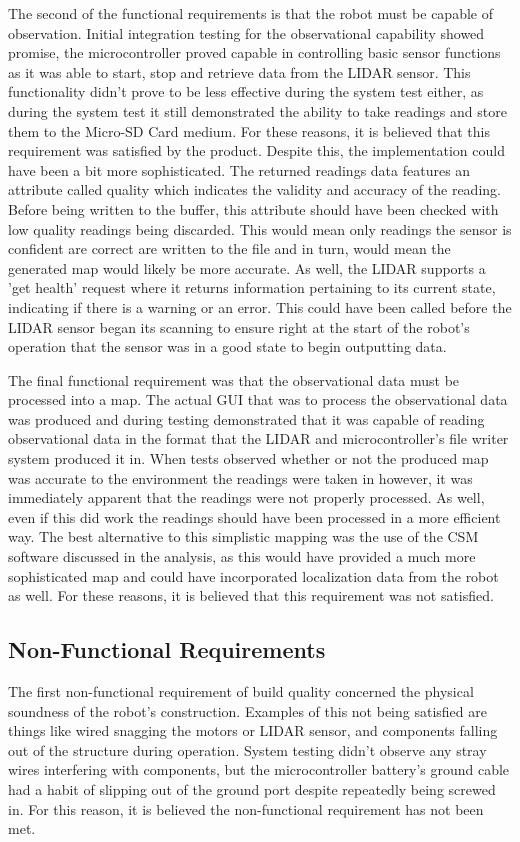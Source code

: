 		The second of the functional requirements is that the robot must be capable of observation. Initial integration testing for the observational capability showed promise, the microcontroller proved capable in controlling basic sensor functions as it was able to start, stop and retrieve data from the LIDAR sensor. This functionality didn't prove to be less effective during the system test either, as during the system test it still demonstrated the ability to take readings and store them to the Micro-SD Card medium. For these reasons, it is believed that this requirement was satisfied by the product. Despite this, the implementation could have been a bit more sophisticated. The returned readings data features an attribute called quality which indicates the validity and accuracy of the reading. Before being written to the buffer, this attribute should have been checked with low quality readings being discarded. This would mean only readings the sensor is confident are correct are written to the file and in turn, would mean the generated map would likely be more accurate. As well, the LIDAR supports a 'get health' request where it returns information pertaining to its current state, indicating if there is a warning or an error. This could have been called before the LIDAR sensor began its scanning to ensure right at the start of the robot's operation that the sensor was in a good state to begin outputting data.
		
		The final functional requirement was that the observational data must be processed into a map. The actual GUI that was to process the observational data was produced and during testing demonstrated that it was capable of reading observational data in the format that the LIDAR and microcontroller's file writer system produced it in. When tests observed whether or not the produced map was accurate to the environment the readings were taken in however, it was immediately apparent that the readings were not properly processed. As well, even if this did work the readings should have been processed in a more efficient way. The best alternative to this simplistic mapping was the use of the CSM software discussed in the analysis, as this would have provided a much more sophisticated map and could have incorporated localization data from the robot as well. For these reasons, it is believed that this requirement was not satisfied.
	
		\subsection{Non-Functional Requirements}
		The first non-functional requirement of build quality concerned the physical soundness of the robot's construction. Examples of this not being satisfied are things like wired snagging the motors or LIDAR sensor, and components falling out of the structure during operation. System testing didn't observe any stray wires interfering with components, but the microcontroller battery's ground cable had a habit of slipping out of the ground port despite repeatedly being screwed in. For this reason, it is believed the non-functional requirement has not been met.
		
